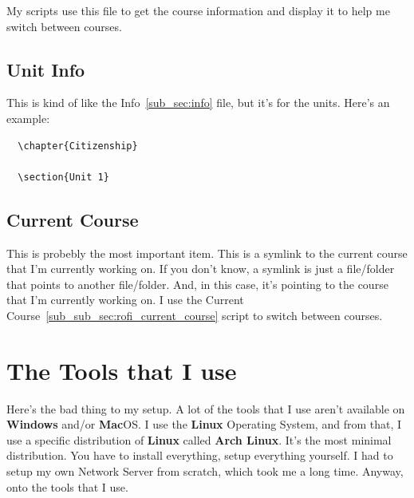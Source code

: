 My scripts use this file to get the course information and display it to help me
switch between courses.


\subsection{Unit Info}
\label{sub_sec:unit_info}

This is kind of like the Info~\ref{sub_sec:info} file, but it's for the units.
Here's an example:

\begin{verbatim}
  \chapter{Citizenship}

  \section{Unit 1}
\end{verbatim}


\subsection{Current Course}
\label{sub_sec:current_course}

This is probebly the most important item. This is a symlink to the current
course that I'm currently working on. If you don't know, a symlink is just a
file/folder that points to another file/folder. And, in this case, it's pointing
to the course that I'm currently working on. I use the Current
Course~\ref{sub_sub_sec:rofi_current_course} script to switch between courses.



\section{The Tools that I use}
\label{sec:the_tools_that_i_use}

Here's the bad thing to my setup. A lot of the tools that I use aren't available
on \textbf{Windows} and/or \textbf{Mac}OS. I use the \textbf{Linux} Operating
System, and from that, I use a specific distribution of \textbf{Linux} called
\textbf{Arch Linux}. It's the most minimal distribution. You have to install
everything, setup everything yourself. I had to setup my own Network Server from
scratch, which took me a long time. Anyway, onto the tools that I use.

